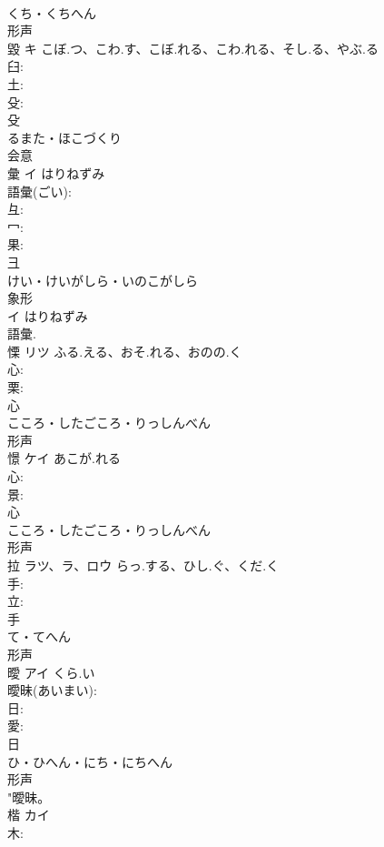 \documentclass[8pt]{extreport}
\begin{document}
\begin{CJK}{UTF8}{min}
\\	くち・くちへん	
\\	形声 
\\	毀	キ	こぼ.つ、こわ.す、こぼ.れる、こわ.れる、そし.る、やぶ.る		
\\	臼: 
\\	土: 
\\	殳: 
\\	殳	
\\	るまた・ほこづくり	
\\	会意 
\\	彙	イ	はりねずみ		
\\	語彙(ごい): 
\\	彑: 
\\	冖: 
\\	果: 
\\	彐	
\\	けい・けいがしら・いのこがしら	
\\	象形 
\\	イ はりねずみ 
\\	語彙.	
\\	慄	リツ	ふる.える、おそ.れる、おのの.く		
\\	心: 
\\	栗: 
\\	心	
\\	こころ・したごころ・りっしんべん	
\\	形声 
\\	憬	ケイ	あこが.れる		
\\	心: 
\\	景: 
\\	心	
\\	こころ・したごころ・りっしんべん	
\\	形声 
\\	拉	ラツ、ラ、ロウ	らっ.する、ひし.ぐ、くだ.く		
\\	手: 
\\	立: 
\\	手	
\\	て・てへん	
\\	形声 
\\	曖	アイ	くら.い		
\\	曖昧(あいまい): 
\\	日: 
\\	愛: 
\\	日	
\\	ひ・ひへん・にち・にちへん	
\\	形声 
\\	"曖昧。 
\\	楷	カイ			
\\	木: 

\end{CJK}
\end{document}

